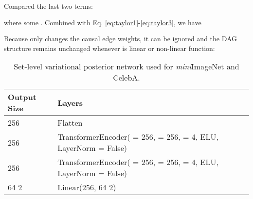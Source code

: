\documentclass[letterpaper]{article} \usepackage{aaai23}  \usepackage{times}  \usepackage{helvet}  \usepackage{courier}  \usepackage[hyphens]{url}  \usepackage{graphicx} \urlstyle{rm} \def\UrlFont{\rm}  \usepackage{natbib}  \usepackage{caption} \frenchspacing  \setlength{\pdfpagewidth}{8.5in}  \setlength{\pdfpageheight}{11in}  \usepackage{algorithm}
\theoremstyle{plain}
\theoremstyle{definition}
\theoremstyle{remark}
\begin{document}
Compared the last two terms:

where some . Combined with Eq. \ref{eq:taylor1}-\ref{eq:taylor3}, we have

Because   only changes the causal edge weights, it can be ignored and the DAG structure remains unchanged whenever  is linear or non-linear function:



\begin{table*}[]
	\centering
	\caption{Set-level variational posterior network  used for \textit{mini}ImageNet and CelebA.}  
	\label{tab:app_set_mini}
	\begin{tabular}{ll}
		\toprule
		Output Size                 & Layers                                                                                           \\ \midrule
		256                         & Flatten                                                                                          \\
		256                         & TransformerEncoder( = 256,  = 256,  = 4, ELU, LayerNorm = False) \\
		256                         & TransformerEncoder( = 256,  = 256,  = 4, ELU, LayerNorm = False) \\
		64  2               & Linear(256, 64  2) \\ \bottomrule
	\end{tabular}
	
\end{table*}
\end{document}
